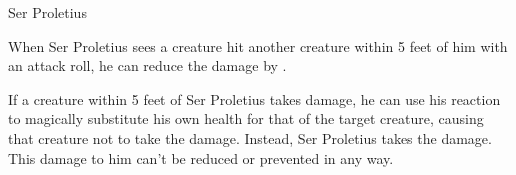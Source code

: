 \begin{DndMonster}[width=\textwidth + 8pt]{Ser Proletius}
\begin{multicols}{2}
		When Ser Proletius sees a creature hit another creature within 5 feet of him with an attack roll, he can reduce the damage by .
		
		If a creature within 5 feet of Ser Proletius takes damage, he can use his reaction to magically substitute his own health for that of the target creature, causing that creature not to take the damage. Instead, Ser Proletius takes the damage. This damage to him can't be reduced or prevented in any way.
	\end{multicols}
\end{DndMonster}